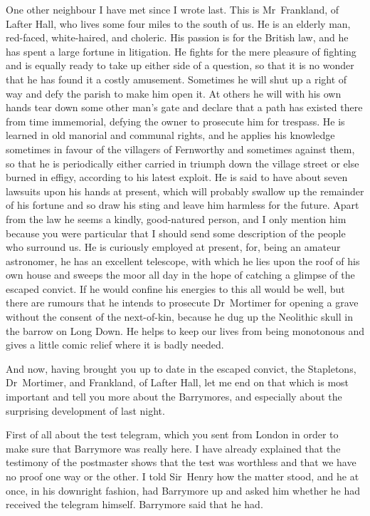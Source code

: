 One other neighbour I have met since I wrote last. This is Mr~Frankland, of Lafter Hall, who lives some four miles to the south of us. He is an elderly man, red-faced, white-haired, and choleric. His passion is for the British law, and he has spent a large fortune in litigation. He fights for the mere pleasure of fighting and is equally ready to take up either side of a question, so that it is no wonder that he has found it a costly amusement. Sometimes he will shut up a right of way and defy the parish to make him open it. At others he will with his own hands tear down some other man's gate and declare that a path has existed there from time immemorial, defying the owner to prosecute him for trespass. He is learned in old manorial and communal rights, and he applies his knowledge sometimes in favour of the villagers of Fernworthy and sometimes against them, so that he is periodically either carried in triumph down the village street or else burned in effigy, according to his latest exploit. He is said to have about seven lawsuits upon his hands at present, which will probably swallow up the remainder of his fortune and so draw his sting and leave him harmless for the future. Apart from the law he seems a kindly, good-natured person, and I only mention him because you were particular that I should send some description of the people who surround us. He is curiously employed at present, for, being an amateur astronomer, he has an excellent telescope, with which he lies upon the roof of his own house and sweeps the moor all day in the hope of catching a glimpse of the escaped convict. If he would confine his energies to this all would be well, but there are rumours that he intends to prosecute Dr~Mortimer for opening a grave without the consent of the next-of-kin, because he dug up the Neolithic skull in the barrow on Long Down. He helps to keep our lives from being monotonous and gives a little comic relief where it is badly needed.

And now, having brought you up to date in the escaped convict, the Stap\-le\-tons, Dr~Mortimer, and Frankland, of Lafter Hall, let me end on that which is most important and tell you more about the Barrymores, and especially about the surprising development of last night.

First of all about the test telegram, which you sent from London in order to make sure that Barrymore was really here. I have already explained that the testimony of the postmaster shows that the test was worthless and that we have no proof one way or the other. I told Sir~Henry how the matter stood, and he at once, in his downright fashion, had Barrymore up and asked him whether he had received the telegram himself. Barrymore said that he had.

